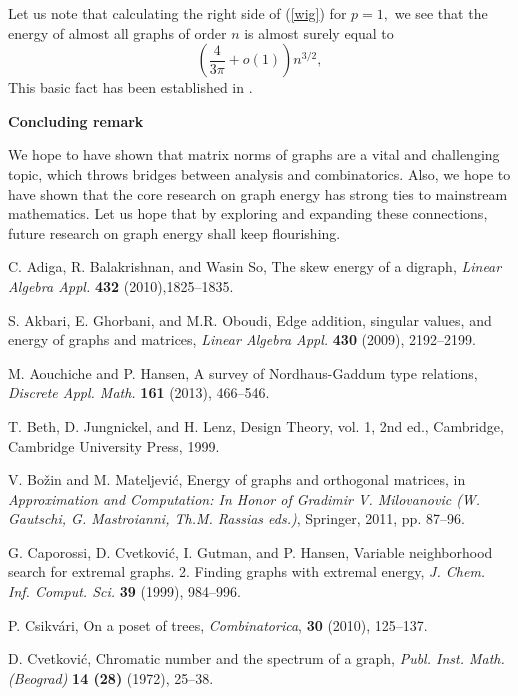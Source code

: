 \documentclass[12pt]{article}%
\begin{document}
Let us note that calculating the right side of (\ref{wig}) for $p=1,$ we see
that the energy of almost all graphs of order $n$ is almost surely equal to
\[
\left(  \frac{4}{3\pi}+o\left(  1\right)  \right)  n^{3/2},
\]
This basic fact has been established in \cite{Nik07i}.\bigskip

\textbf{Concluding remark\medskip}

We hope to have shown that matrix norms of graphs are a vital and challenging
topic, which throws bridges between analysis and combinatorics. Also, we hope
to have shown that the core research on graph energy has strong ties to
mainstream mathematics. Let us hope that by exploring and expanding these
connections, future research on graph energy shall keep flourishing.\bigskip
\bigskip

\begin{thebibliography}{99}                                                                                               %


C. Adiga, R. Balakrishnan, and Wasin So, The skew energy of a
digraph, \emph{Linear Algebra Appl.} \textbf{432} (2010),1825--1835.

S. Akbari, E. Ghorbani, and M.R. Oboudi, Edge addition,
singular values, and energy of graphs and matrices, \emph{Linear Algebra
Appl.} \textbf{430} (2009), 2192--2199.

M. Aouchiche and P. Hansen, A survey of Nordhaus-Gaddum type
relations, \emph{Discrete Appl. Math. }\textbf{161} (2013), 466--546.

T. Beth, D. Jungnickel, and H. Lenz, Design Theory, vol. 1,
2nd ed., Cambridge, Cambridge University Press, 1999.

V. Bo\v{z}in and M. Mateljevi\'{c}, Energy of graphs and
orthogonal matrices, in \emph{ Approximation and Computation: In Honor of
Gradimir V. Milovanovic (W. Gautschi, G. Mastroianni, Th.M. Rassias eds.)},
Springer, 2011, pp. 87--96.

G. Caporossi, D. Cvetkovi\'{c}, I. Gutman, and P. Hansen,
Variable neighborhood search for extremal graphs. 2. Finding graphs with
extremal energy, \emph{J. Chem. Inf. Comput. Sci.} \textbf{39} (1999), 984--996.

P. Csikv\'{a}ri, On a poset of trees, \emph{Combinatorica},
\textbf{30} (2010), 125--137.

D. Cvetkovi\'{c}, Chromatic number and the spectrum of a
graph, \emph{Publ. Inst. Math. (Beograd)} \textbf{14 (28) }(1972), 25--38.


\end{thebibliography}
\end{document}
